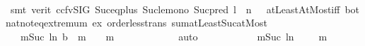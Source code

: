 \begin{isabellebody}
\ \ \ \ \ \ \ \ \isamarkupfalse%
\ {\isacharparenleft}{\kern0pt}smt\ {\isacharparenleft}{\kern0pt}verit{\isacharcomma}{\kern0pt}\ ccfv{\isacharunderscore}{\kern0pt}SIG{\isacharparenright}{\kern0pt}\ Suc{\isacharunderscore}{\kern0pt}eq{\isacharunderscore}{\kern0pt}plus{}\ Suc{\isacharunderscore}{\kern0pt}le{\isacharunderscore}{\kern0pt}mono\ Suc{\isacharunderscore}{\kern0pt}pred{\isacharprime}{\kern0pt}\ {\isacartoucheopen}l\ {\isasymin}\ {\isacharbraceleft}{\kern0pt}{}{\isachardot}{\kern0pt}{\isachardot}{\kern0pt}n\ {\isacharminus}{\kern0pt}\ {}{\isacharbraceright}{\kern0pt}{\isacartoucheclose}\ atLeastAtMost{\isacharunderscore}{\kern0pt}iff\ bot{\isacharunderscore}{\kern0pt}nat{\isacharunderscore}{\kern0pt}{}{\isachardot}{\kern0pt}not{\isacharunderscore}{\kern0pt}eq{\isacharunderscore}{\kern0pt}extremum\ ex\ order{\isacharunderscore}{\kern0pt}less{\isacharunderscore}{\kern0pt}trans\ sum{\isachardot}{\kern0pt}atLeast{\isacharunderscore}{\kern0pt}Suc{\isacharunderscore}{\kern0pt}atMost{\isacharparenright}{\kern0pt}\isanewline
\ \ \ \ \ \ \isamarkupfalse%
\ \isamarkupfalse%
\ {\isachardoublequoteopen}{\isachardot}{\kern0pt}{\isachardot}{\kern0pt}{\isachardot}{\kern0pt}\ {\isacharequal}{\kern0pt}\ {\isacharparenleft}{\kern0pt}{\isasymSum}m{\isasymin}{\isacharbraceleft}{\kern0pt}Suc\ {\isacharparenleft}{\kern0pt}l{\isacharplus}{\kern0pt}{}{\isacharparenright}{\kern0pt}{\isachardot}{\kern0pt}{\isachardot}{\kern0pt}n{\isacharbraceright}{\kern0pt}{\isachardot}{\kern0pt}\ {\isacharparenleft}{\kern0pt}b\ {\isacharbang}{\kern0pt}\ {\isacharparenleft}{\kern0pt}m{\isacharminus}{\kern0pt}{}{\isacharparenright}{\kern0pt}{\isacharparenright}{\kern0pt}\ {\isacharslash}{\kern0pt}\ {}\ {\isacharcircum}{\kern0pt}\ m{\isacharparenright}{\kern0pt}{\isachardoublequoteclose}\isanewline
\ \ \ \ \ \ \ \ \isamarkupfalse%
\ {}\ \isamarkupfalse%
\ auto\isanewline
\ \ \ \ \ \ \isamarkupfalse%
\ \isamarkupfalse%
\ {\isachardoublequoteopen}{\isachardot}{\kern0pt}{\isachardot}{\kern0pt}{\isachardot}{\kern0pt}\ {\isasymle}\ {\isacharparenleft}{\kern0pt}{\isasymSum}m{\isasymin}{\isacharbraceleft}{\kern0pt}Suc\ {\isacharparenleft}{\kern0pt}l{\isacharplus}{\kern0pt}{}{\isacharparenright}{\kern0pt}{\isachardot}{\kern0pt}{\isachardot}{\kern0pt}n{\isacharbraceright}{\kern0pt}{\isachardot}{\kern0pt}\ {}\ {\isacharslash}{\kern0pt}\ {}\ {\isacharcircum}{\kern0pt}\ m{\isacharparenright}{\kern0pt}{\isachardoublequoteclose}\isanewline

\end{isabellebody}
